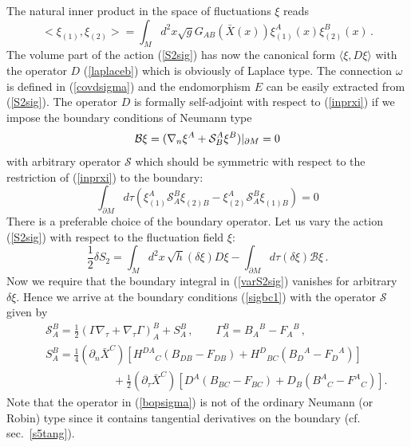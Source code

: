 The natural inner product in the space of fluctuations $\xi$
reads
\begin{equation}
<\xi_{(1)},\xi_{(2)}>=\int_M d^2x \sqrt{g} G_{AB}(\bar X(x))
\xi_{(1)}^A (x) \xi_{(2)}^B(x) \,.\label{inprxi}
\end{equation}
The volume part of the action (\ref{S2sig}) has now the canonical
form $\langle \xi ,D\xi \rangle$ with the operator $D$ (\ref{laplaceb})
which is obviously of Laplace type.  The connection $\omega$ is defined in 
(\ref{covdsigma}) and
the endomorphism $E$ can be easily extracted from (\ref{S2sig}).
The operator $D$ 
is formally self-adjoint with respect to (\ref{inprxi}) if
we impose the boundary conditions of Neumann type
\begin{equation}
\mathcal{B}\xi =(\nabla_n \xi^A +\mathcal{S}_B^A\xi^B)\vert_{\partial M} =0 \label{sigbc1}
\end{equation}
with arbitrary operator $\mathcal{S}$ which should be symmetric
with respect to the restriction of (\ref{inprxi}) to the boundary:
\begin{equation}
\int_{\partial M} d\tau (\xi_{(1)}^A \mathcal{S}_A^B \xi_{(2)B}
-\xi_{(2)}^A \mathcal{S}_A^B \xi_{(1)B}) =0
\end{equation}
There is a preferable choice of the boundary operator.
Let us vary the action (\ref{S2sig}) with respect to
the fluctuation field $\xi$:
\begin{equation}
\frac 12 \delta S_2 =\int_Md^2x\, \sqrt{h} (\delta\xi ) D\xi -
\int_{\partial M} d\tau (\delta \xi ) \mathcal{B}\xi \,.
\label{varS2sig}
\end{equation}
Now we require that the boundary integral in (\ref{varS2sig}) vanishes
for arbitrary $\delta \xi$. Hence we arrive at the boundary conditions
(\ref{sigbc1}) with the operator $\mathcal{S}$ given by
\begin{eqnarray}
&&\mathcal{S}_{A}^B=\frac 12 (\Gamma \nabla_\tau +
\nabla_\tau \Gamma )_A^B +S_A^B \,,\qquad\Gamma_{A}^B={B_A}^B-{F_A}^B \,, 
\label{bopsigma} \\
&& S_A^B=\frac 14 (\partial_n \bar X^C)
\left[ {H^{DA}}_{C}(B_{DB}-F_{DB}) 
+{H^{D}}_{BC}({B_D}^A-{F_D}^A)\right]\nonumber\\
&&\qquad\qquad\qquad
+\frac 12 (\partial_\tau \bar X^C)\left[ D^A (B_{BC}-F_{BC} )
+D_B ({B^A}_C-{F^A}_C)
\right].  \nonumber 
\end{eqnarray}
Note that the operator in (\ref{bopsigma}) is not of the
ordinary Neumann (or Robin) type since it contains tangential
derivatives on the boundary (cf. sec.\ \ref{s5tang}).

